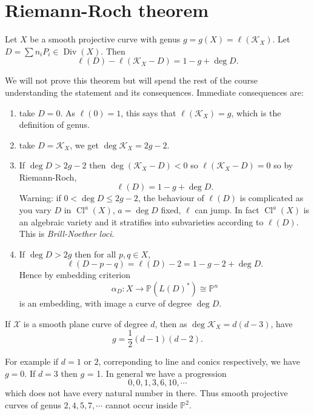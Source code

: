 \documentclass[a4paper]{article}
\DeclareMathOperator{\Cl}{Cl}
\renewcommand*{\P}{\mathbb{P}}
\DeclareMathOperator{\Div}{Div} %
\begin{document}
\section{Riemann-Roch theorem}

\begin{theorem}
  Let \(X\) be a smooth projective curve with genus \(g = g(X) = \ell(\mathcal K_X)\). Let \(D = \sum n_i P_i \in \Div(X)\). Then
  \[
    \ell(D) - \ell(\mathcal K_X - D) = 1 - g + \deg D.
  \]
\end{theorem}
We will not prove this theorem but will spend the rest of the course understanding the statement and its consequences. Immediate consequences are:
\begin{enumerate}
\item take \(D = 0\). As \(\ell(0) = 1\), this says that \(\ell(\mathcal K_X) = g\), which is the definition of genus.
\item take \(D = \mathcal K_X\), we get \(\deg \mathcal K_X = 2g - 2\).
\item If \(\deg D > 2g - 2\) then \(\deg (\mathcal K_X - D) < 0\) so \(\ell(\mathcal K_X - D) = 0\) so by Riemann-Roch,
  \[
    \ell(D) = 1 - g + \deg D.
  \]
  Warning: if \(0 < \deg D \leq 2g - 2\), the behaviour of \(\ell(D)\) is complicated as you vary \(D\) in \(\Cl^a(X)\), \(a = \deg D\) fixed, \(\ell\) can jump. In fact \(\Cl^a(X)\) is an algebraic variety and it stratifies into subvarieties according to \(\ell(D)\). This is \emph{Brill-Noether loci}.
\item If \(\deg D > 2g\) then for all \(p, q \in X\),
  \[
    \ell(D - p - q) = \ell(D) - 2 = 1- g - 2 + \deg D.
  \]
  Hence by embedding criterion
  \[
    \alpha_D: X \to \P(L(D)^*) \cong \P^n
  \]
  is an embedding, with image a curve of degree \(\deg D\).
\end{enumerate}

\begin{corollary}
  If \(\mathcal X\) is a smooth plane curve of degree \(d\), then as \(\deg \mathcal K_X = d(d - 3)\), have
  \[
    g = \frac{1}{2}(d - 1)(d - 2).
  \]
\end{corollary}

For example if \(d = 1\) or \(2\), correponding to line and conics respectively, we have \(g = 0\). If \(d = 3\) then \(g\) = 1. In general we have a progression
\[
  0, 0, 1, 3, 6, 10, \cdots
\]
which does not have every natural number in there. Thus smooth projective curves of genus \(2, 4, 5, 7, \cdots\) cannot occur inside \(\P^2\).
\end{document}
